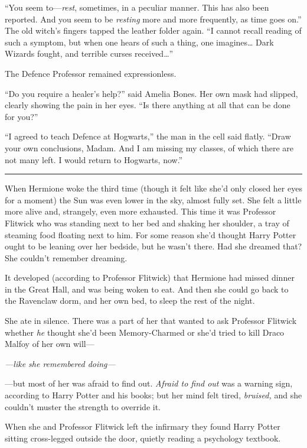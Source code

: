 ``You seem to---\emph{rest}, sometimes, in a peculiar manner. This has
also been reported. And you seem to be \emph{resting} more and more
frequently, as time goes on.'' The old witch's fingers tapped the
leather folder again. ``I cannot recall reading of such a symptom, but
when one hears of such a thing, one imagines\ldots{} Dark Wizards
fought, and terrible curses received\ldots{}''

The Defence Professor remained expressionless.

``Do you require a healer's help?'' said Amelia Bones. Her own mask had
slipped, clearly showing the pain in her eyes. ``Is there anything at
all that can be done for you?''

``I agreed to teach Defence at Hogwarts,'' the man in the cell said
flatly. ``Draw your own conclusions, Madam. And I am missing my classes,
of which there are not many left. I would return to Hogwarts, now.''

\begin{center}\rule{3in}{0.4pt}\end{center}

When Hermione woke the third time (though it felt like she'd only closed
her eyes for a moment) the Sun was even lower in the sky, almost fully
set. She felt a little more alive and, strangely, even more exhausted.
This time it was Professor Flitwick who was standing next to her bed and
shaking her shoulder, a tray of steaming food floating next to him. For
some reason she'd thought Harry Potter ought to be leaning over her
bedside, but he wasn't there. Had she dreamed that? She couldn't
remember dreaming.

It developed (according to Professor Flitwick) that Hermione had missed
dinner in the Great Hall, and was being woken to eat. And then she could
go back to the Ravenclaw dorm, and her own bed, to sleep the rest of the
night.

She ate in silence. There was a part of her that wanted to ask Professor
Flitwick whether \emph{he} thought she'd been Memory-Charmed or she'd
tried to kill Draco Malfoy of her own will---

\emph{---like she remembered doing---}

---but most of her was afraid to find out. \emph{Afraid to find out} was
a warning sign, according to Harry Potter and his books; but her mind
felt tired, \emph{bruised,} and she couldn't muster the strength to
override it.

When she and Professor Flitwick left the infirmary they found Harry
Potter sitting cross-legged outside the door, quietly reading a
psychology textbook.

